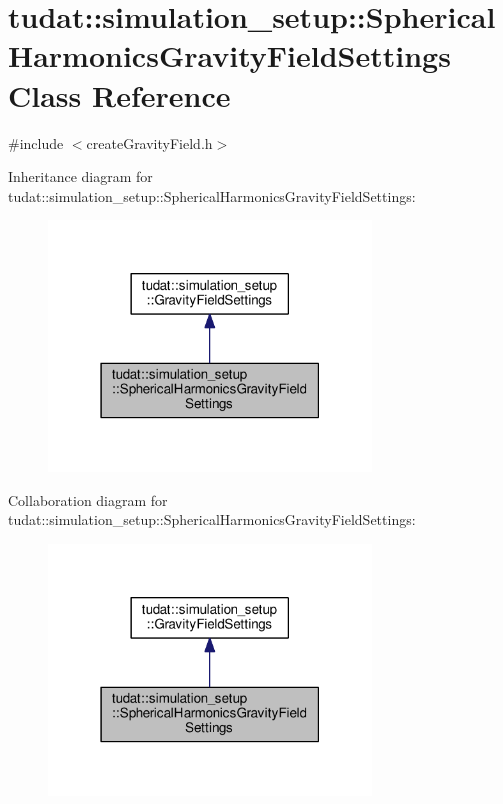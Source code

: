 \hypertarget{classtudat_1_1simulation__setup_1_1SphericalHarmonicsGravityFieldSettings}{}\section{tudat\+:\+:simulation\+\_\+setup\+:\+:Spherical\+Harmonics\+Gravity\+Field\+Settings Class Reference}
\label{classtudat_1_1simulation__setup_1_1SphericalHarmonicsGravityFieldSettings}


{\ttfamily \#include $<$create\+Gravity\+Field.\+h$>$}



Inheritance diagram for tudat\+:\+:simulation\+\_\+setup\+:\+:Spherical\+Harmonics\+Gravity\+Field\+Settings\+:
\nopagebreak
\begin{figure}[H]
\begin{center}
\leavevmode
\includegraphics[width=243pt]{classtudat_1_1simulation__setup_1_1SphericalHarmonicsGravityFieldSettings__inherit__graph}
\end{center}
\end{figure}


Collaboration diagram for tudat\+:\+:simulation\+\_\+setup\+:\+:Spherical\+Harmonics\+Gravity\+Field\+Settings\+:
\nopagebreak
\begin{figure}[H]
\begin{center}
\leavevmode
\includegraphics[width=243pt]{classtudat_1_1simulation__setup_1_1SphericalHarmonicsGravityFieldSettings__coll__graph}
\end{center}
\end{figure}
